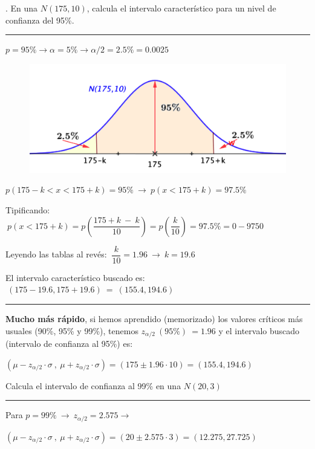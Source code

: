 \vspace{4mm} %
\begin{example}
.	En una $N(175,10)$, calcula el intervalo característico para un nivel de confianza del 95\%.

\rule{150pt}{0.1pt}

$p=95\% \to \alpha=5\% \to \alpha/2=2.5\%=0.0025$

\begin{figure}[H]
	\centering
	\includegraphics[width=.5\textwidth]{imagenes/imagenes05/T05IM03.png}
	\end{figure}

$ p(175-k<x<175+k)=95\% \ \to \ p(x<175+k)=97.5\%$

Tipificando:  $\ p(x<175+k)=p\left( \dfrac{175+k\ -\ k}{10} \right) = p\left( \dfrac{k}{10} \right) =97.5\%=0-9750$

Leyendo las tablas al revés: $\ \dfrac{k}{10}=1.96 \ \to \ k=19.6$

El intervalo característico buscado es: $\ (175-19.6,175+19.6)\ = \ (155.4,194.6)$

\rule{150pt}{0.1pt}

\textbf{Mucho más rápido}, si hemos aprendido (memorizado) los valores críticos más usuales (90\%, 95\% y 99\%), tenemos $z_{\alpha/2}\ (95\%)\ =1.96$ y el intervalo buscado (intervalo de confianza al 95\%) es:

 
$(\mu-z_{\alpha/2}\cdot \sigma\ , \ \mu+z_{\alpha/2}\cdot \sigma )=
(175\pm 1.96\cdot 10) = (155.4,194.6)$
	
\end{example}

\vspace{4mm}%
\begin{ejemplo}
\begin{ejre}
Calcula el intervalo de confianza al 99\% en una $N(20,3)$	

\rule{150pt}{0.1pt}

Para $p=99\% \ \to \ z_{\alpha/2}=2.575 \to $

$(\mu-z_{\alpha/2}\cdot \sigma\ , \ \mu+z_{\alpha/2}\cdot \sigma )=
(20\pm 2.575\cdot 3) = (12.275,27.725)$
\end{ejre}	
\end{ejemplo}

